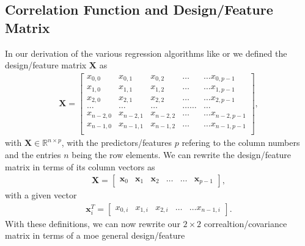 \documentclass[letterpaper,10pt,english]{sphinxmanual}
\begin{document}
\subsection{Correlation Function and Design/Feature Matrix}
\label{\detokenize{chapter8:correlation-function-and-design-feature-matrix}}
In our derivation of the various regression algorithms like  or 
we defined the design/feature matrix \(\boldsymbol{X}\) as
\begin{equation*}
\begin{split}
\boldsymbol{X}=\begin{bmatrix}
x_{0,0} & x_{0,1} & x_{0,2}& \dots & \dots x_{0,p-1}\\
x_{1,0} & x_{1,1} & x_{1,2}& \dots & \dots x_{1,p-1}\\
x_{2,0} & x_{2,1} & x_{2,2}& \dots & \dots x_{2,p-1}\\
\dots & \dots & \dots & \dots \dots & \dots \\
x_{n-2,0} & x_{n-2,1} & x_{n-2,2}& \dots & \dots x_{n-2,p-1}\\
x_{n-1,0} & x_{n-1,1} & x_{n-1,2}& \dots & \dots x_{n-1,p-1}\\
\end{bmatrix},
\end{split}
\end{equation*}
with \(\boldsymbol{X}\in {\mathbb{R}}^{n\times p}\), with the predictors/features \(p\)  refering to the column numbers and the
entries \(n\) being the row elements.
We can rewrite the design/feature matrix in terms of its column vectors as
\begin{equation*}
\begin{split}
\boldsymbol{X}=\begin{bmatrix} \boldsymbol{x}_0 & \boldsymbol{x}_1 & \boldsymbol{x}_2 & \dots & \dots & \boldsymbol{x}_{p-1}\end{bmatrix},
\end{split}
\end{equation*}
with a given vector
\begin{equation*}
\begin{split}
\boldsymbol{x}_i^T = \begin{bmatrix}x_{0,i} & x_{1,i} & x_{2,i}& \dots & \dots x_{n-1,i}\end{bmatrix}.
\end{split}
\end{equation*}
With these definitions, we can now rewrite our \(2\times 2\)
correaltion/covariance matrix in terms of a moe general design/feature
\end{document}
